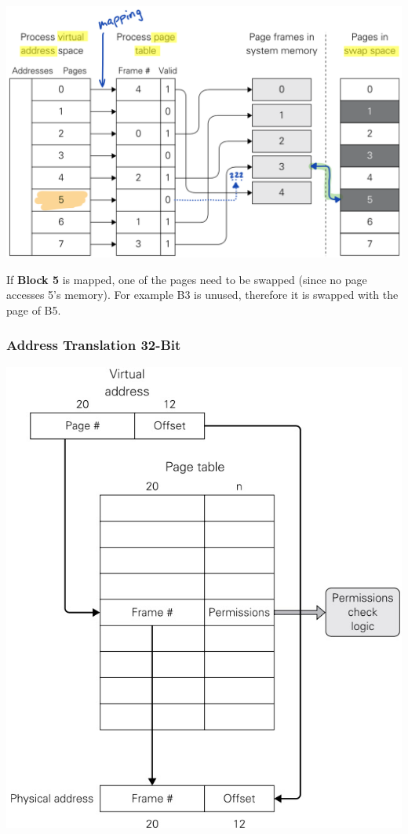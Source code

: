 \documentclass[
  10pt,
  a4paper,
]{article}
\begin{document}
\begin{multicols*}{2}
\includegraphics{images/performance/image-21.png}

{\small

If {\bfseries\color{Orange}Block 5} is mapped, one of the pages need to
be swapped (since no page accesses 5's memory). For example B3 is
unused, therefore it is swapped with the page of B5.

}

\subsubsection{Address Translation
32-Bit}\label{address-translation-32-bit}

\includegraphics{images/performance/image-22.png}


\end{multicols*}
\end{document}
